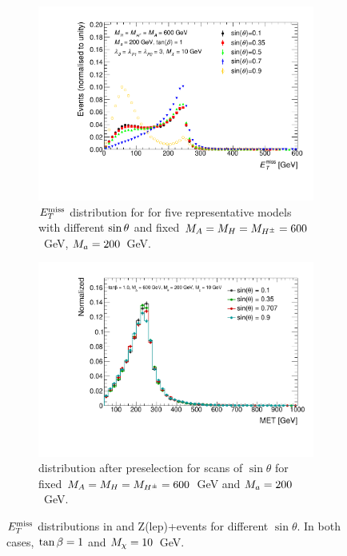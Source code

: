 \begin{figure}%
	\centering

	\begin{subfigure}[t]{0.45\textwidth}
	\centering
	\includegraphics[width=\textwidth]{texinputs/04_grid/figures/monoHbb_sinp_scan_MA600_Ma200_MET_liny_norm2one.pdf}
	\caption{$E_T^\mathrm{miss}$ distribution for for five representative models with different $\sin\theta$ and fixed $M_{A} = M_{H} = M_{H^{\pm}} = 600 $~GeV, $M_{a} = 200$~GeV.
	\label{fig:monoHbb_sinp_scan_mA600_ma200_met}} 
    \end{subfigure}
    \begin{subfigure}[t]{0.45\textwidth}
	\centering
	\includegraphics[width=\textwidth]{texinputs/04_grid/figures/monoz/leptonic/SinpScan_mA600_ma200_MET.pdf}	
	\caption{\MET distribution after preselection for scans of $\sin{\theta}$ for fixed $M_{A} = M_{H} = M_{H^{\pm}} = 600 $~GeV and $M_{a} = 200 $~GeV.
	\label{fig:monoz_kin_sintheta}}
    \end{subfigure}
    
    \caption{$E_T^\mathrm{miss}$ distributions in \monohbb and Z(lep)+\MET events for different $\sin{\theta}$. In both cases, $\tan\beta = 1$ and $M_{\chi} = 10$~GeV. }
    
\end{figure}

